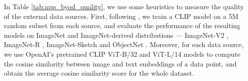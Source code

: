 In Table \ref{tab:app_byod_quality}, we use some heuristics to measure the quality of the external data sources. First, following \citet{nguyen2022quality}, we train a CLIP model on a 5M random subset from each source, and evaluate the performance of the resulting models on ImageNet and ImageNet-derived distributions --- ImageNet-V2 \cite{imagenetv2}, ImageNet-R \cite{imagenetr}, ImageNet-Sketch \cite{imagenetsketch} and ObjectNet \cite{objectnet}. Moreover, for each data source, we use OpenAI's pretrained CLIP ViT-B/32 and ViT-L/14 models to compute the cosine similarity between image and text embeddings of a data point, and obtain the average cosine similarity score for the whole dataset.

\begin{table}

\setlength\tabcolsep{4pt}
\renewcommand{\arraystretch}{1.1}
\small
\centering
\caption{Zero-shot performance for select baselines in the \byod track. Unless specified otherwise, \pool means our pool filtered with CLIP score (L/14, 30\%). }
\end{table}
